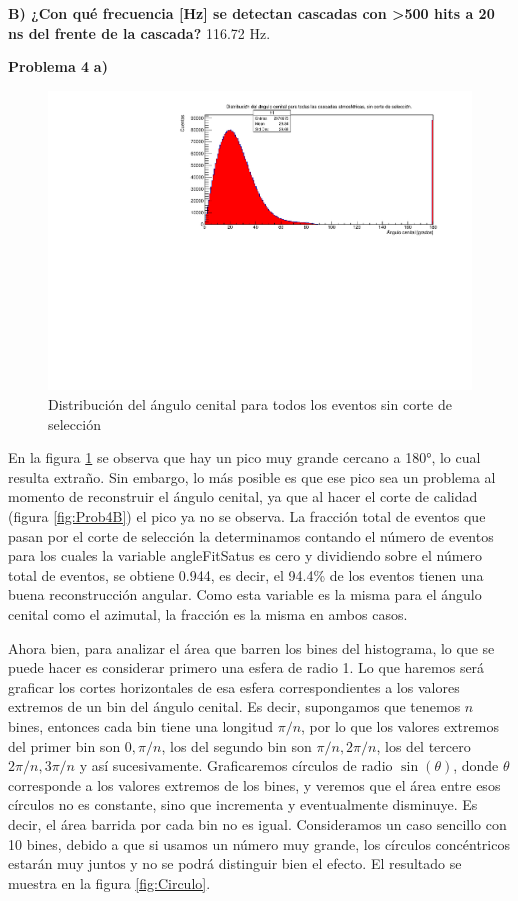 \documentclass[11pt]{article}
\begin{document}
\textbf{B) ¿Con qué frecuencia [Hz] se detectan cascadas con >500 hits a 20 ns del frente de la cascada?}
116.72 Hz.
\pagebreak

\textbf{Problema 4}
\textbf{a)}
\begin{figure}[H]
\centering
\includegraphics[width=1\textwidth]{../Figuras/Prob4A}
\caption{Distribución del ángulo cenital para todos los eventos sin corte de selección}
\label{fig:Prob4A}
\end{figure}
En la figura \ref{fig:Prob4A} se observa que hay un pico muy grande cercano a 180°, lo cual resulta extraño. Sin embargo, lo más posible es que ese pico sea un problema al momento de reconstruir el ángulo cenital, ya que al hacer el corte de calidad (figura \ref{fig:Prob4B}) el pico ya no se observa. La fracción total de eventos que pasan por el corte de selección la determinamos contando el número de eventos para los cuales la variable angleFitSatus es cero y dividiendo sobre el número total de eventos, se obtiene 0.944, es decir, el 94.4\% de los eventos tienen una buena reconstrucción angular. Como esta variable es la misma para el ángulo cenital como el azimutal, la fracción es la misma en ambos casos.

Ahora bien, para analizar el área que barren los bines del histograma, lo que se puede hacer es considerar primero una esfera de radio 1. Lo que haremos será graficar los cortes horizontales de esa esfera correspondientes a los valores extremos de un bin del ángulo cenital. Es decir, supongamos que tenemos $n$ bines, entonces cada bin tiene una longitud $\pi/n$, por lo que los valores extremos del primer bin son $0,\pi/n$, los del segundo bin son $\pi/n, 2\pi/n$, los del tercero $2\pi/n, 3\pi/n$ y así sucesivamente. Graficaremos círculos de radio $\sin(\theta)$, donde $\theta$ corresponde a los valores extremos de los bines, y veremos que el área entre esos círculos no es constante, sino que incrementa y eventualmente disminuye. Es decir, el área barrida por cada bin no es igual. Consideramos un caso sencillo con 10 bines, debido a que si usamos un número muy grande, los círculos concéntricos estarán muy juntos y no se podrá distinguir bien el efecto. El resultado se muestra en la figura \ref{fig:Circulo}.
\end{document}
